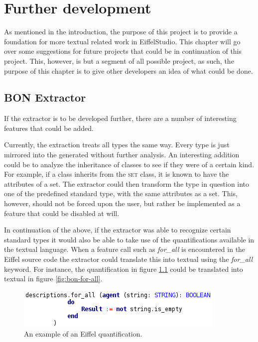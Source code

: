 \chapter{Further development}
As mentioned in the introduction, the purpose of this project is to provide a foundation for more textual \bon{} related work in EiffelStudio. This chapter will go over some suggestions for future projects that could be in continuation of this project. This, however, is but a segment of all possible project, as such, the purpose of this chapter is to give other developers an idea of what could be done.
\section{BON Extractor}
If the \bon{} extractor is to be developed further, there are a number of interesting features that could be added. 

Currently, the \bon{} extraction treats all types the same way. Every type is just mirrored into the generated \bon{} without further analysis. An interesting addition could be to analyze the inheritance of classes to see if they were of a certain kind. For example, if a class inherits from the \textsc{set} class, it is known to have the attributes of a set. The extractor could then transform the type in question into one of the predefined standard type, with the same attributes as a set. This, however, should not be forced upon the user, but rather be implemented as a feature that could be disabled at will.

In continuation of the above, if the extractor was able to recognize certain standard types it would also be able to take use of the quantifications available in the textual \bon{} language. When a feature call such as \textit{for\_all} is encountered in the Eiffel source code the extractor could translate this into textual \bon{} using the \textit{for\_all} keyword. For instance, the quantification in figure \ref{fig:agent-for-all} could be translated into textual \bon{} in figure \ref{fig:bon-for-all}.
\begin{figure}[h]
\centerline{
\includegraphics[scale=0.7]{images/agent_example.png} 
}
\caption{An example of an Eiffel quantification.}
\label{fig:agent-for-all}
\end{figure}

